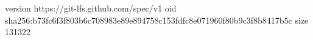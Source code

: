 version https://git-lfs.github.com/spec/v1
oid sha256:b73fc6f3f803b6c708983e89e894758c153fdfc8e071960f80b9c3f8b8417b5c
size 131322

